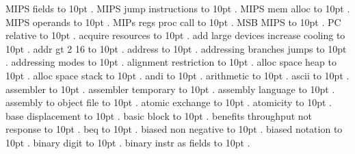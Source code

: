 MIPS fields \leaders\hbox to 10pt {\hss.\hss}  \hfill {}
\smallskip
MIPS jump instructions \leaders\hbox to 10pt {\hss.\hss}  \hfill {}
\smallskip
MIPS mem alloc \leaders\hbox to 10pt {\hss.\hss}  \hfill {}
\smallskip
MIPS operands \leaders\hbox to 10pt {\hss.\hss}  \hfill {}
\smallskip
MIPs regs proc call \leaders\hbox to 10pt {\hss.\hss}  \hfill {}
\smallskip
MSB MIPS \leaders\hbox to 10pt {\hss.\hss}  \hfill {}
\smallskip
PC relative \leaders\hbox to 10pt {\hss.\hss}  \hfill {}
\smallskip
acquire resources \leaders\hbox to 10pt {\hss.\hss}  \hfill {}
\smallskip
add large devices increase cooling \leaders\hbox to 10pt {\hss.\hss}  \hfill {}
\smallskip
addr gt 2 16 \leaders\hbox to 10pt {\hss.\hss}  \hfill {}
\smallskip
address \leaders\hbox to 10pt {\hss.\hss}  \hfill {}
\smallskip
addressing branches jumps \leaders\hbox to 10pt {\hss.\hss}  \hfill {}
\smallskip
addressing modes \leaders\hbox to 10pt {\hss.\hss}  \hfill {}
\smallskip
alignment restriction \leaders\hbox to 10pt {\hss.\hss}  \hfill {}
\smallskip
alloc space heap \leaders\hbox to 10pt {\hss.\hss}  \hfill {}
\smallskip
alloc space stack \leaders\hbox to 10pt {\hss.\hss}  \hfill {}
\smallskip
andi \leaders\hbox to 10pt {\hss.\hss}  \hfill {}
\smallskip
arithmetic \leaders\hbox to 10pt {\hss.\hss}  \hfill {}
\smallskip
ascii \leaders\hbox to 10pt {\hss.\hss}  \hfill {}
\smallskip
assembler \leaders\hbox to 10pt {\hss.\hss}  \hfill {}
\smallskip
assembler temporary \leaders\hbox to 10pt {\hss.\hss}  \hfill {}
\smallskip
assembly language \leaders\hbox to 10pt {\hss.\hss}  \hfill {}
\smallskip
assembly to object file \leaders\hbox to 10pt {\hss.\hss}  \hfill {}
\smallskip
atomic exchange \leaders\hbox to 10pt {\hss.\hss}  \hfill {}
\smallskip
atomicity \leaders\hbox to 10pt {\hss.\hss}  \hfill {}
\smallskip
base displacement \leaders\hbox to 10pt {\hss.\hss}  \hfill {}
\smallskip
basic block \leaders\hbox to 10pt {\hss.\hss}  \hfill {}
\smallskip
benefits throughput not response \leaders\hbox to 10pt {\hss.\hss}  \hfill {}
\smallskip
beq \leaders\hbox to 10pt {\hss.\hss}  \hfill {}
\smallskip
biased non negative \leaders\hbox to 10pt {\hss.\hss}  \hfill {}
\smallskip
biased notation \leaders\hbox to 10pt {\hss.\hss}  \hfill {}
\smallskip
binary digit \leaders\hbox to 10pt {\hss.\hss}  \hfill {}
\smallskip
binary instr as fields \leaders\hbox to 10pt {\hss.\hss}  \hfill {}
